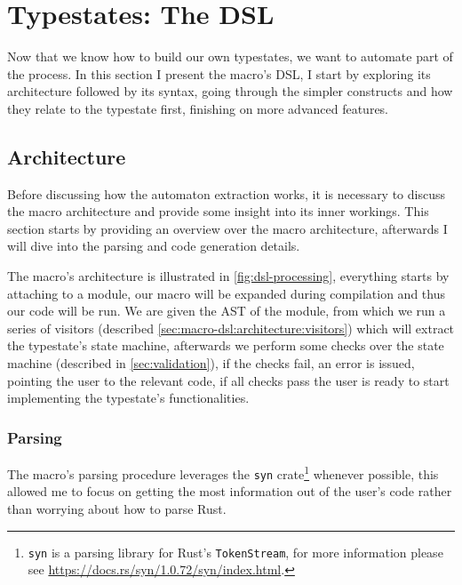 \section{Typestates: The DSL}\label{sec:macro-dsl}

Now that we know how to build our own typestates,
we want to automate part of the process.
In this section I present the macro's DSL,
I start by exploring its architecture followed by its syntax,
going through the simpler constructs and how they relate to the typestate first,
finishing on more advanced features.

\subsection{Architecture}\label{sec:macro-dsl:architecture}

Before discussing how the automaton extraction works, it is necessary to discuss the macro architecture and
provide some insight into its inner workings.
This section starts by providing an overview over the macro architecture,
afterwards I will dive into the parsing and code generation details.

The macro's architecture is illustrated in \autoref{fig:dsl-processing},
everything starts by attaching  to a module,
our macro will be expanded during compilation and thus our code will be run.
We are given the \gls{AST} of the module, from which we run a series of visitors
(described \autoref{sec:macro-dsl:architecture:visitors}) which will extract the typestate's state machine,
afterwards we perform some checks over the state machine (described in \autoref{sec:validation}),
if the checks fail, an error is issued, pointing the user to the relevant code,
if all checks pass the user is ready to start implementing the typestate's functionalities.



\subsubsection{Parsing}

The macro's parsing procedure leverages the \texttt{syn} crate\footnote{\texttt{syn} is a parsing library for Rust's \texttt{TokenStream},
for more information please see \url{https://docs.rs/syn/1.0.72/syn/index.html}.} whenever possible,
this allowed me to focus on getting the most information out of the user's code rather than worrying about how to parse Rust.

